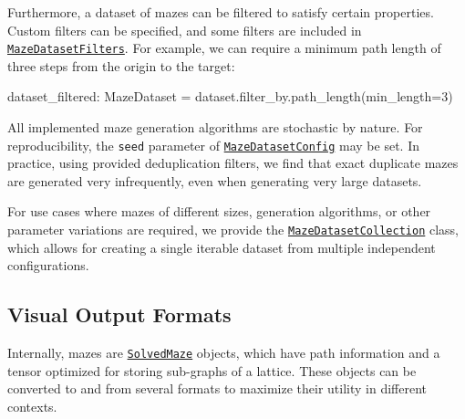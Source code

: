 \documentclass[10pt,a4paper,onecolumn]{article}
\newenvironment{Shaded}{}{}
\newcommand{\DecValTok}[1]{\textcolor[rgb]{0.25,0.63,0.44}{#1}}
\newcommand{\NormalTok}[1]{#1}
\newcommand{\OperatorTok}[1]{\textcolor[rgb]{0.40,0.40,0.40}{#1}}
\begin{document}
Furthermore, a dataset of mazes can be filtered to satisfy certain
properties. Custom filters can be specified, and some filters are
included in
\href{https://understanding-search.github.io/maze-dataset/maze_dataset/dataset/filters.html\#MazeDatasetFilters}{\texttt{MazeDatasetFilters}}.
For example, we can require a minimum path length of three steps from
the origin to the target:

\begin{Shaded}
\begin{Highlighting}[]
\NormalTok{dataset\_filtered: MazeDataset }\OperatorTok{=}\NormalTok{ dataset.filter\_by.path\_length(min\_length}\OperatorTok{=}\DecValTok{3}\NormalTok{)}
\end{Highlighting}
\end{Shaded}

All implemented maze generation algorithms are stochastic by nature. For
reproducibility, the \texttt{seed} parameter of
\href{https://understanding-search.github.io/maze-dataset/maze_dataset.html\#MazeDatasetConfig}{\texttt{MazeDatasetConfig}}
may be set. In practice, using provided deduplication filters, we find
that exact duplicate mazes are generated very infrequently, even when
generating very large datasets.

For use cases where mazes of different sizes, generation algorithms, or
other parameter variations are required, we provide the
\href{https://understanding-search.github.io/maze-dataset/maze_dataset/dataset/collected_dataset.html\#MazeDatasetCollection}{\texttt{MazeDatasetCollection}}
class, which allows for creating a single iterable dataset from multiple
independent configurations.

\hypertarget{visual-output-formats}{%
\subsection{Visual Output Formats}\label{visual-output-formats}}

Internally, mazes are
\href{https://understanding-search.github.io/maze-dataset/maze_dataset.html\#SolvedMaze}{\texttt{SolvedMaze}}
objects, which have path information and a tensor optimized for storing
sub-graphs of a lattice. These objects can be converted to and from
several formats to maximize their utility in different contexts.
\end{document}
